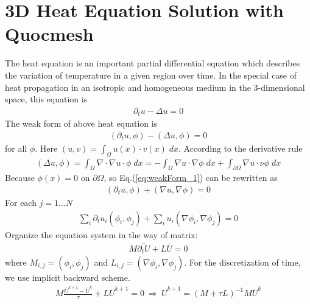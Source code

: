 %
\section{3D Heat Equation Solution with Quocmesh}
The heat equation is an important partial differential equation
which describes the variation of temperature in a given region
over time. In the special case of heat propagation in an isotropic
and homogeneous medium in the 3-dimensional space, this equation
is
\begin{eqnarray}
\partial_t u- \Delta u = 0
\end{eqnarray}
The weak form of above heat equation is
\begin{eqnarray}
 (\partial_t u, \phi) - (\Delta u, \phi) = 0
\label{eq:weakForm_1}
\end{eqnarray}
for all $\phi$. Here $(u,v)=\int_\Omega u(x)\cdot v(x)\;dx$.
According to the derivative rule
\begin{eqnarray*}
(\Delta u, \phi)
=\int_\Omega \nabla\cdot\nabla u\cdot \phi\;dx =
-\int_\Omega\nabla u\cdot\nabla \phi\;dx+
\int_{\partial\Omega}\nabla u \cdot\nu\phi\;dx
\end{eqnarray*}
Because $\phi(x)=0 $ on $\partial\Omega$, so
Eq.(\ref{eq:weakForm_1}) can be rewritten as
\begin{eqnarray}
 (\partial_t u, \phi) +(\nabla u, \nabla \phi)=0
\end{eqnarray}
For each $j=1...N$
\begin{eqnarray}
 \sum_i\partial_t u_i(\phi_i,\phi_j) + \sum_i u_i(
 \nabla\phi_i,\nabla\phi_j)= 0
\end{eqnarray}
Organize the equation system in the way of matrix:
\begin{eqnarray}
M \overline{\partial_t U} + L \overline{U} = 0
\end{eqnarray}
where $M_{i,j}= (\phi_i,\phi_j)$ and $L_{i,j} =
(\nabla\phi_i,\nabla\phi_j)$. For the discretization of time,
 we use implicit backward scheme.
\begin{eqnarray*}
M \frac{\overline{U}^{k+1}-\overline{U}^{k}}{\tau} + L
\overline{U}^{k+1} = 0 \ \Rightarrow \  \overline{U}^{k+1} =
(M+\tau L)^{-1} M \overline{U}^k
\end{eqnarray*}
